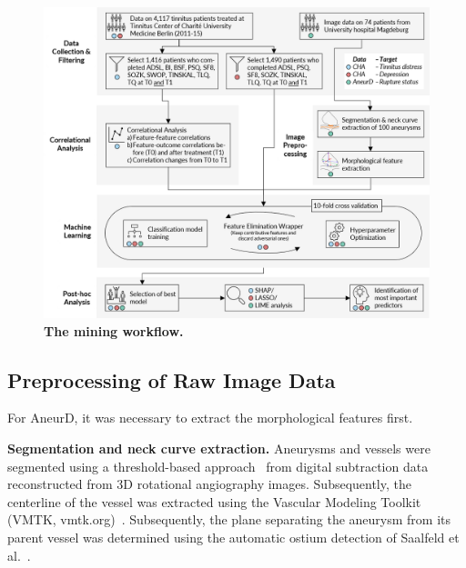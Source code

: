 \documentclass[
  oneside]{book}
\begin{document}
\begin{figure}

{\centering \includegraphics[width=1\linewidth]{figures/09-iml-workflow-cropped} 

}

\caption{\textbf{The mining workflow.}}\label{fig:09-iml-workflow-cropped}
\end{figure}

\hypertarget{preprocessing-of-raw-image-data}{%
\subsection{Preprocessing of Raw Image Data}\label{preprocessing-of-raw-image-data}}

For AneurD, it was necessary to extract the morphological features first.

\textbf{Segmentation and neck curve extraction.}
Aneurysms and vessels were segmented using a threshold-based approach~\autocite{Glasser2015} from digital subtraction data reconstructed from 3D rotational angiography images.
Subsequently, the centerline of the vessel was extracted using the Vascular Modeling Toolkit (VMTK, vmtk.org)~\autocite{Antiga2008}.
Subsequently, the plane separating the aneurysm from its parent vessel was determined using the automatic ostium detection of Saalfeld et al.~\autocite{Saalfeld2018}.
\end{document}
